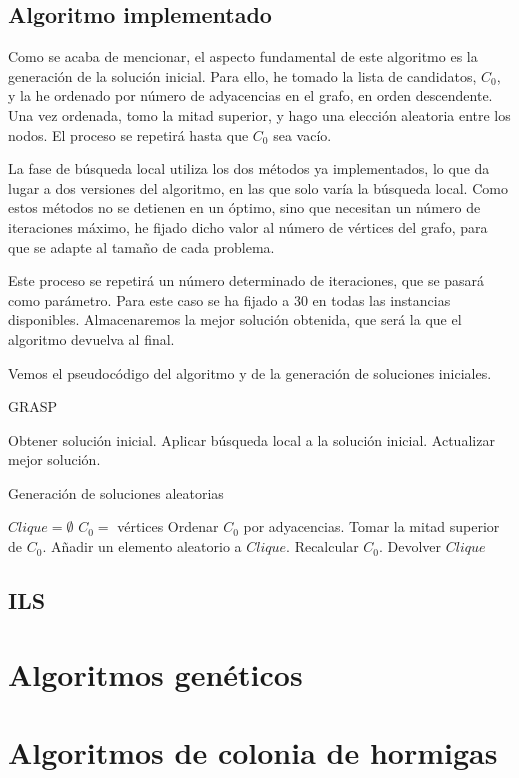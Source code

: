 \subsection{Algoritmo implementado}

Como se acaba de mencionar, el aspecto fundamental de este algoritmo es la generación de la solución inicial.
Para ello, he tomado la lista de candidatos, $C_0$, y la he ordenado por número de adyacencias en el grafo,
en orden descendente. Una vez ordenada, tomo la mitad superior, y hago una elección aleatoria entre los nodos.
El proceso se repetirá hasta que $C_0$ sea vacío.

La fase de búsqueda local utiliza los dos métodos ya implementados, lo que da lugar a dos versiones del algoritmo,
en las que solo varía la búsqueda local. Como estos métodos no se detienen en un óptimo, sino que necesitan
un número de iteraciones máximo, he fijado dicho valor al número de vértices del grafo, para que se adapte
al tamaño de cada problema.

Este proceso se repetirá un número determinado de iteraciones, que se pasará como parámetro. Para este caso
se ha fijado a 30 en todas las instancias disponibles. Almacenaremos la mejor solución obtenida, que será
la que el algoritmo devuelva al final.

Vemos el pseudocódigo del algoritmo y de la generación de soluciones iniciales.

\begin{algorithm}[H]
\caption{GRASP}
  \begin{algorithmic}
  \Repeat
    \State Obtener solución inicial.
    \State Aplicar búsqueda local a la solución inicial.
    \State Actualizar mejor solución.
  \end{algorithmic}
\end{algorithm}

\begin{algorithm}[H]
\caption{Generación de soluciones aleatorias}
  \begin{algorithmic}
    \State $Clique = \emptyset$
    \State $C_0 =$ vértices
    \Repeat
      \State Ordenar $C_0$ por adyacencias.
      \State Tomar la mitad superior de $C_0$.
      \State Añadir un elemento aleatorio a $Clique$.
      \State Recalcular $C_0$.
    \State Devolver $Clique$
  \end{algorithmic}
\end{algorithm}


\subsection{ILS}


\section{Algoritmos genéticos}

\section{Algoritmos de colonia de hormigas}
